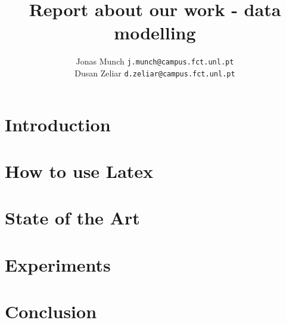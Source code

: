 \documentclass[a4paper, 10 pt, conference]{ieeeconf}
\title{\LARGE \bf
Report about our work - data modelling
}
\author{
Jonas Munch {\tt\small j.munch@campus.fct.unl.pt} \\
Dusan Zeliar {\tt\small d.zeliar@campus.fct.unl.pt}
}
\begin{document}
\maketitle
\thispagestyle{empty}
\pagestyle{empty}



\begin{abstract}

\end{abstract}


\section{Introduction}
\label{sec:introduction}



\section{How to use Latex}


\section{State of the Art}
\label{sec:related_work}



\section{Experiments}
\label{sec:experiments}



\section{Conclusion}
\label{sec:conclusion}



\addtolength{\textheight}{0cm}   %
\end{document}

